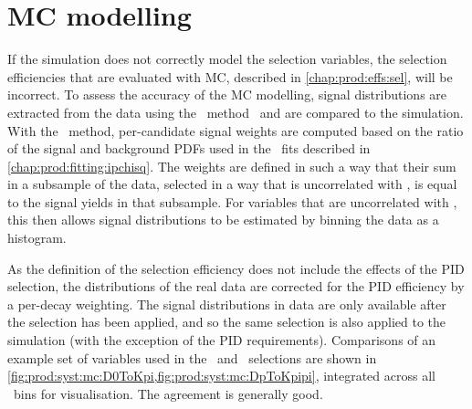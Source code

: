 \section{\acl{MC} modelling}
\label{chap:prod:syst:mc}

If the simulation does not correctly model the selection variables, the
selection efficiencies that are evaluated with \ac{MC}, described in
\cref{chap:prod:effs:sel}, will be incorrect.
To assess the accuracy of the \acl{MC} modelling, signal distributions are
extracted from the data using the \sPlot\ method~\cite{Pivk:2004ty} and are
compared to the simulation.
With the \sPlot\ method, per-candidate signal weights are computed based on the 
ratio of the signal and background \acp{PDF} used in the \lnipchisq\ fits 
described in \cref{chap:prod:fitting:ipchisq}.
The weights are defined in such a way that their sum in a subsample of the 
data, selected in a way that is uncorrelated with \lnipchisq, is equal to the 
signal yields in that subsample.
For variables that are uncorrelated with \lnipchisq, this then allows signal 
distributions to be estimated by binning the data as a histogram.

As the definition of the selection efficiency does not include the effects of
the \ac{PID} selection, the distributions of the real data are corrected for
the \ac{PID} efficiency by a per-decay weighting.
The signal distributions in data are only available after the selection has
been applied, and so the same selection is also applied to the simulation (with
the exception of the \ac{PID} requirements).
Comparisons of an example set of variables used in the \DzToKpi\ and
\DpToKpipi\ selections are shown in
\cref{fig:prod:syst:mc:D0ToKpi,fig:prod:syst:mc:DpToKpipi}, integrated across
all \pTy\ bins for visualisation.
The agreement is generally good.

